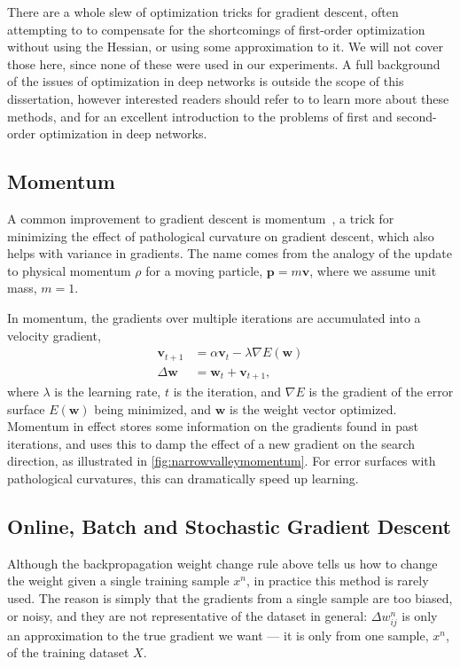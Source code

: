 \documentclass[thesis]{subfiles}
\begin{document}
There are a whole slew of optimization tricks for gradient descent, often attempting to to compensate for the shortcomings of first-order optimization without using the Hessian, or using some approximation to it. We will not cover those here, since none of these were used in our experiments. A full background of the issues of optimization in deep networks is outside the scope of this dissertation, however interested readers should refer to \citet{goodfellow2016deep} to learn more about these methods, and \citet{martens2010deep} for an excellent introduction to the problems of first and second-order optimization in deep networks.

\subsection{Momentum}
A common improvement to gradient descent is momentum~\citep{polyak1964some,rumelhartbackprop}, a trick for minimizing the effect of pathological curvature on gradient descent, which also helps with variance in gradients. The name comes from the analogy of the update to physical momentum $\rho$ for a moving particle, $\mathbf{p}=m\mathbf{v}$, where we assume unit mass, $m=1$.

In momentum, the gradients over multiple iterations are accumulated into a velocity gradient, 
\begin{equation}
\begin{aligned}
\mathbf{v}_{t+1} &= \alpha \mathbf{v}_t - \lambda\nabla E(\mathbf{w})\\
\Delta\mathbf{w} &= \mathbf{w}_t + \mathbf{v}_{t+1},
\end{aligned}
\end{equation}
where $\lambda$ is the learning rate, $t$ is the iteration, and $\nabla E$ is the gradient of the error surface $E(\mathbf{w})$ being minimized, and $\mathbf{w}$ is the weight vector optimized. Momentum in effect stores some information on the gradients found in past iterations, and uses this to damp the effect of a new gradient on the search direction, as illustrated in \cref{fig:narrowvalleymomentum}. For error surfaces with pathological curvatures, this can dramatically speed up learning.

\subsection{Online, Batch and Stochastic Gradient Descent}
Although the backpropagation weight change rule above tells us how to change the weight given a single training sample $x^n$, in practice this method is rarely used. The reason is simply that the gradients from a single sample are too biased, or noisy, and they are not representative of the dataset in general: $\Delta w^n_{ij}$ is only an approximation to the true gradient we want --- it is only from one sample, $x^n$, of the training dataset $X$. 
\end{document}
